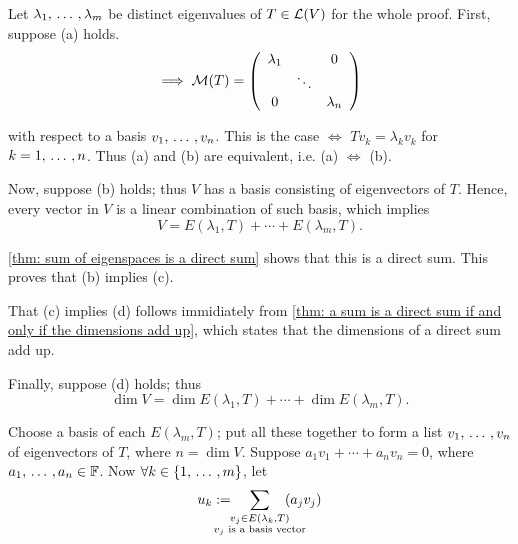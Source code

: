 \begin{prf}
  \StepOne Let $\lambda_1, {\, \ldots \,\,}, \lambda_m$ be distinct eigenvalues of $T \in \mathcal{L} (V)$ for the whole proof. First, suppose (a) holds.
  \begin{equation}
    \implies
    \mathcal{M}(T) =
    \left( {\begin{array}{ccc}
        \lambda_1 &         & 0 \\
        &  \ddots &    \\
        0      &         & \lambda_n
    \end{array} } \right)
  \end{equation}

  with respect to a basis $v_1, {\, \ldots \,\,}, v_n$. This is the case $\iff$ $Tv_k = \lambda_k v_k$ for $k = 1, {\, \ldots \,\,}, n$. Thus (a) and (b) are equivalent, i.e. (a) $\iff$ (b).

  \StepTwo Now, suppose (b) holds; thus $V$ has a basis consisting of eigenvectors of $T$. Hence, every vector in $V$ is a linear combination of such basis, which implies
  \begin{equation}
    V = E(\lambda_1, T) + \cdots + E(\lambda_m, T).
  \end{equation}

  \ref{thm: sum of eigenspaces is a direct sum} shows that this is a direct sum. This proves that (b) implies (c).

  \StepThree That (c) implies (d) follows immidiately from \ref{thm: a sum is a direct sum if and only if the dimensions add up}, which states that the dimensions of a direct sum add up.

  \StepFour Finally, suppose (d) holds; thus
  \begin{equation}
    \dim V = \dim E(\lambda_1, T) + \cdots + \dim E(\lambda_m, T).
  \end{equation}

  Choose a basis of each $E(\lambda_m, T)$; put all these together to form a list $v_1, {\, \ldots \,\,}, v_n$ of eigenvectors of $T$, where $n = \dim V$. Suppose $a_1 v_1 + \cdots + a_n v_n = 0$, where $a_1, {\, \ldots \,\,}, a_n \in \mathbb{F}$.
  Now $\forall k \in \{1, {\, \ldots \,\,}, m \}$, let
  \begin{equation}
    u_k := \hspace{-1.5em} \sum_{\substack{v_j \in E(\lambda_k, T) \\ \text{$v_j$ is a basis vector}}} \hspace{-1.5em} (a_j v_j)
  \end{equation}


\end{prf}
